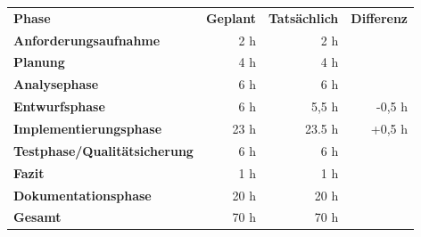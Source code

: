\begin{tabu}{lrrr}
\rowfont{\bfseries\leavevmode\color{headingfont}}\textbf{Phase} & \textbf{Geplant} & \textbf{Tatsächlich} & \textbf{Differenz} \\
\textbf{Anforderungsaufnahme} & 2 h & 2 h & \\
\textbf{Planung} & 4 h & 4 h & \\ 
\textbf{Analysephase} & 6 h & 6 h  &  \\
\textbf{Entwurfsphase} & 6 h & 5,5 h & -0,5 h \\
\textbf{Implementierungsphase} & 23 h  & 23.5 h  & +0,5 h \\
\textbf{Testphase/Qualitätsicherung} & 6 h & 6 h & \\
\textbf{Fazit} & 1 h & 1 h & \\
\textbf{Dokumentationsphase} & 20 h & 20 h & \\
\hline
\hline
{}\textbf{Gesamt} & 70 h & 70 h & \\
\end{tabu}
